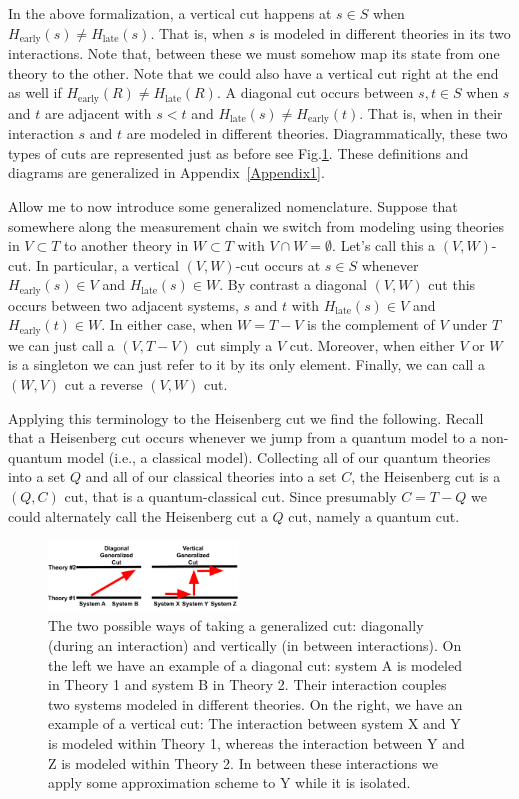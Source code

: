\documentclass[prd,twocolumn,superscriptaddress,floatfix,amsmath,amssymb,amsfonts,nofootinbib]{revtex4-2}
\begin{document}
In the above formalization, a vertical cut happens at $s\in S$ when $H_\text{early}(s)\neq H_\text{late}(s)$. That is, when $s$ is modeled in different theories in its two interactions. Note that, between these we must somehow map its state from one theory to the other. Note that we could also have a vertical cut right at the end as well if $H_\text{early}(R)\neq H_\text{late}(R)$. A diagonal cut occurs between $s,t\in S$ when $s$ and $t$ are adjacent with $s<t$ and $H_\text{late}(s)\neq H_\text{early}(t)$. That is, when in their interaction $s$ and $t$ are modeled in different theories. Diagrammatically, these two types of cuts are represented just as before see Fig.\ref{FigGen}. These definitions and diagrams are generalized in Appendix~\ref{Appendix1}.

Allow me to now introduce some generalized nomenclature. Suppose that somewhere along the measurement chain we switch from modeling using theories in $V\subset T$ to another theory in $W\subset T$ with $V\cap W=\emptyset$. Let's call this a $(V,W)$-cut. In particular, a vertical $(V,W)$-cut occurs at $s\in S$ whenever $H_\text{early}(s)\in V$ and $H_\text{late}(s)\in W$. By contrast a diagonal $(V,W)$ cut this occurs between two adjacent systems, $s$ and $t$ with $H_\text{late}(s)\in V$ and $H_\text{early}(t)\in W$. In either case, when $W=T-V$ is the complement of $V$ under $T$ we can just call a $(V,T-V)$ cut simply a $V$ cut. Moreover, when either $V$ or $W$ is a singleton we can just refer to it by its only element. Finally, we can call a $(W,V)$ cut a reverse $(V,W)$ cut.

Applying this terminology to the Heisenberg cut we find the following. Recall that a Heisenberg cut occurs whenever we jump from a quantum model to a non-quantum model (i.e., a classical model). Collecting all of our quantum theories into a set $Q$ and all of our classical theories into a set $C$, the Heisenberg cut is a $(Q,C)$ cut, that is a quantum-classical cut. Since presumably $C=T-Q$ we could alternately call the Heisenberg cut a $Q$ cut, namely a quantum cut.

\begin{figure}
\includegraphics[width=0.45\textwidth]{Figures/DiagVsVertGen.pdf}
\caption{The two possible ways of taking a generalized cut: diagonally (during an interaction) and vertically (in between interactions). On the left we have an example of a diagonal cut: system A is modeled in Theory 1 and system B in Theory 2. Their interaction couples two systems modeled in different theories. On the right, we have an example of a vertical cut: The interaction between system X and Y is modeled within Theory 1, whereas the interaction between Y and Z is modeled within Theory 2. In between these interactions we apply some approximation scheme to Y while it is isolated.}\label{FigGen}
\end{figure}
\end{document}

